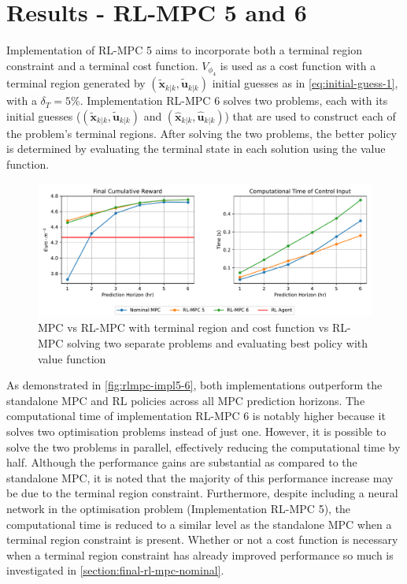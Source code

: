 \section{Results - RL-MPC 5 and 6}

Implementation of RL-MPC 5 aims to incorporate both a terminal region constraint and a terminal cost function. ${V}_{\phi_4}$ is used as a cost function with a terminal region generated by $(\tilde{\mathbf{x}}_{k|k},\tilde{\mathbf{u}}_{k|k})$ initial guesses as in \autoref{eq:initial-guess-1}, with a $\delta_T =5\%$. Implementation RL-MPC 6 solves two problems, each with its initial guesses ($(\tilde{\mathbf{x}}_{k|k},\tilde{\mathbf{u}}_{k|k})$ and $(\hat{\mathbf{x}}_{k|k},\hat{\mathbf{u}}_{k|k})$) that are used to construct each of the problem's terminal regions. After solving the two problems, the better policy is determined by evaluating the terminal state in each solution using the value function.

\begin{figure}[H]
	\centering
	\includegraphics[width=\textwidth]{figures/rl_mpc_impl_5_6.pdf}
	\caption{MPC vs RL-MPC with terminal region and cost function vs RL-MPC solving two separate problems and evaluating best policy with value function}
	\label{fig:rlmpc-impl5-6}
\end{figure}

As demonstrated in \autoref{fig:rlmpc-impl5-6}, both implementations outperform the standalone MPC and RL policies across all MPC prediction horizons. The computational time of implementation RL-MPC 6 is notably higher because it solves two optimisation problems instead of just one. However, it is possible to solve the two problems in parallel, effectively reducing the computational time by half. Although the performance gains are substantial as compared to the standalone MPC, it is noted that the majority of this performance increase may be due to the terminal region constraint. Furthermore, despite including a neural network in the optimisation problem (Implementation RL-MPC 5), the computational time is reduced to a similar level as the standalone MPC when a terminal region constraint is present. Whether or not a cost function is necessary when a terminal region constraint has already improved performance so much is investigated in \autoref{section:final-rl-mpc-nominal}.


